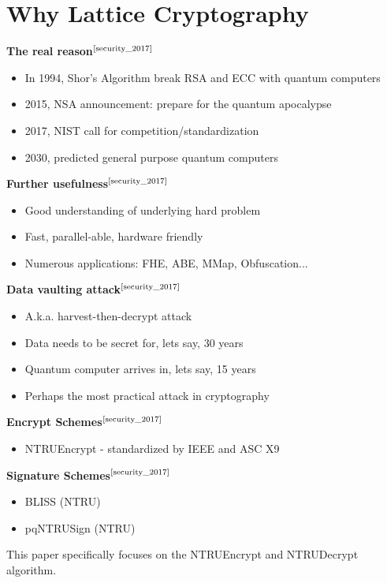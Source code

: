 \documentclass[a4paper,12pt]{article}
\begin{document}
\section{Why Lattice Cryptography}
\begin{flushleft}
\textbf{The real reason}$^{\text{\cite{security_2017}}}$
\begin{itemize}
    \item In 1994, Shor's Algorithm break RSA and ECC with quantum computers
    \item 2015, NSA announcement: prepare for the quantum apocalypse
    \item 2017, NIST call for competition/standardization
    \item 2030, predicted general purpose quantum computers
\end{itemize}

\textbf{Further usefulness}$^{\text{\cite{security_2017}}}$
\begin{itemize}
    \item Good understanding of underlying hard problem
    \item Fast, parallel-able, hardware friendly
    \item Numerous applications: FHE, ABE, MMap, Obfuscation...
\end{itemize}

\textbf{Data vaulting attack}$^{\text{\cite{security_2017}}}$
\begin{itemize}
    \item A.k.a. harvest-then-decrypt attack
    \item Data needs to be secret for, lets say, 30 years
    \item Quantum computer arrives in, lets say, 15 years
    \item Perhaps the most practical attack in cryptography
\end{itemize}

\textbf{Encrypt Schemes}$^{\text{\cite{security_2017}}}$
\begin{itemize}
    \item NTRUEncrypt - standardized by IEEE and ASC X9
\end{itemize}

\textbf{Signature Schemes}$^{\text{\cite{security_2017}}}$
\begin{itemize}
    \item BLISS (NTRU)
    \item pqNTRUSign (NTRU)
\end{itemize}

This paper specifically focuses on the NTRUEncrypt and NTRUDecrypt algorithm.
\end{flushleft}
\end{document}
